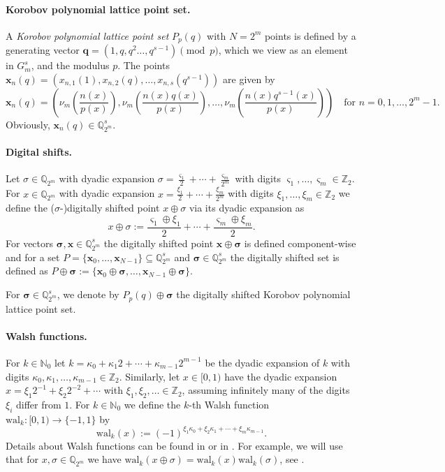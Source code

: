 \documentclass[12pt]{article}
\theoremstyle{definition}
\numberwithin{equation}{section}
\begin{document}
\paragraph{Korobov polynomial lattice point set.}
A \textit{Korobov polynomial lattice point set} $P_p(q)$ with $N=2^m$ points is defined by a generating vector $\bm{q} = (1, q, q^2 \ldots, q^{s-1}) \pmod{p}$, which we view as an element in $G_m^s$, and the modulus $p$. The points $\bm{x}_n(q) = (x_{n,1}(1), x_{n,2}(q), \ldots, x_{n,s}(q^{s-1}))$ are given by
\[
\bm{x}_n(q) = \left( \nu_m\left(\frac{n(x)}{p(x)}\right), \nu_m\left( \frac{n(x) q(x) }{p(x)} \right), \ldots, \nu_m\left(\frac{n(x)q^{s-1}(x)}{p(x)}\right) \right) \quad \text{for } n = 0, 1, \ldots, 2^m-1.
\]
Obviously, $\bm{x}_n(q) \in \mathbb{Q}_{2^m}^s$.

\paragraph{Digital shifts.} Let $\sigma \in \mathbb{Q}_{2^m}$ with dyadic expansion $\sigma=\frac{\varsigma_1}{2}+\cdots+\frac{\varsigma_m}{2^m}$ with digits $\varsigma_1,\ldots,\varsigma_m \in \mathbb{Z}_2$. For $x \in  \mathbb{Q}_{2^m}$ with dyadic expansion $x=\frac{\xi_1}{2}+\cdots+\frac{\xi_m}{2^m}$ with digits $\xi_1,\ldots,\xi_m \in \mathbb{Z}_2$ we define the ($\sigma$-)digitally shifted point $x \oplus \sigma$ via its dyadic expansion as $$x \oplus \sigma:=\frac{\varsigma_1 \oplus \xi_1}{2}+\cdots +\frac{\varsigma_m \oplus \xi_m}{2}.$$ For vectors $\bm{\sigma},\bm{x} \in \mathbb{Q}_{2^m}^s$ the digitally shifted point $\bm{x} \oplus \bm{\sigma}$ is defined component-wise and for a set $P=\{\bm{x}_0,\ldots,\bm{x}_{N-1}\} \subseteq \mathbb{Q}_{2^m}^s$ and $\bm{\sigma} \in \mathbb{Q}_{2^m}^s$ the digitally shifted set is defined as $P\oplus \bm{\sigma}:=\{\bm{x}_0\oplus \bm{\sigma},\ldots,\bm{x}_{N-1}\oplus \bm{\sigma}\}$.

For $\bm{\sigma} \in \mathbb{Q}_{2^m}^s$, we denote by $P_p(q) \oplus \bm{\sigma}$ the digitally shifted Korobov polynomial lattice point set.

\paragraph{Walsh functions.} For $k \in \mathbb{N}_0$ let $k = \kappa_0 + \kappa_1 2 + \cdots + \kappa_{m-1} 2^{m-1}$ be the dyadic expansion of $k$ with digits $\kappa_0, \kappa_1, \ldots, \kappa_{m-1} \in \mathbb{Z}_2$. Similarly, let $x \in [0,1)$ have the dyadic expansion $x = \xi_1 2^{-1} + \xi_2 2^{-2} + \cdots$ with $\xi_1, \xi_2, \ldots \in \mathbb{Z}_2$, assuming infinitely many of the digits $\xi_i$ differ from $1$. For $k \in \mathbb{N}_0$ we define the $k$-th Walsh function $\mathrm{wal}_k: [0,1) \to \{-1,1\}$ by
\begin{equation*}
\mathrm{wal}_k(x) := (-1)^{\xi_1 \kappa_0 + \xi_2 \kappa_1 + \cdots + \xi_{m} \kappa_{m-1}}.
\end{equation*}
Details about Walsh functions can be found in \cite{Fine,SWS} or in \cite[Appendix~A]{DKP10}. For example, we will use that for $x,\sigma \in \mathbb{Q}_{2^m}$ we have $\mathrm{wal}_k(x \oplus \sigma)=\mathrm{wal}_k(x) \mathrm{wal}_k(\sigma)$, see \cite[Appendix~A]{DKP10}.
\end{document}
